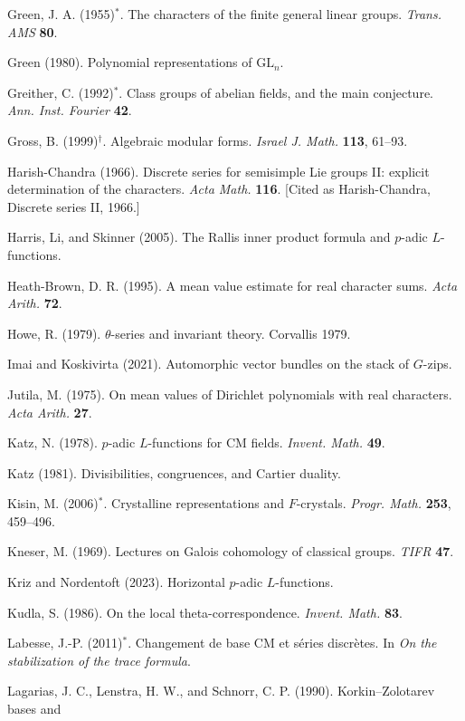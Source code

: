 \begin{list}{}{\setlength{\leftmargin}{1.5em}\setlength{\itemindent}{-1.5em}\setlength{\itemsep}{2pt}\setlength{\parsep}{0pt}}
\item Green, J. A. (1955)$^*$. The characters of the finite general linear groups. \emph{Trans. AMS}
  \textbf{80}.
\item Green (1980). Polynomial representations of $\mathrm{GL}_n$.
\item Greither, C. (1992)$^*$. Class groups of abelian fields, and the main conjecture. \emph{Ann.
  Inst. Fourier} \textbf{42}.
\item Gross, B. (1999)$^\dagger$. Algebraic modular forms. \emph{Israel J. Math.} \textbf{113},
  61--93.
\item Harish-Chandra (1966). Discrete series for semisimple Lie groups II: explicit determination of
  the characters. \emph{Acta Math.} \textbf{116}. [Cited as Harish-Chandra, Discrete series II, 1966.]
\item Harris, Li, and Skinner (2005). The Rallis inner product formula and $p$-adic $L$-functions.
\item Heath-Brown, D. R. (1995). A mean value estimate for real character sums. \emph{Acta Arith.}
  \textbf{72}.
\item Howe, R. (1979). $\theta$-series and invariant theory. Corvallis 1979.
\item Imai and Koskivirta (2021). Automorphic vector bundles on the stack of $G$-zips.
\item Jutila, M. (1975). On mean values of Dirichlet polynomials with real characters. \emph{Acta
  Arith.} \textbf{27}.
\item Katz, N. (1978). $p$-adic $L$-functions for CM fields. \emph{Invent. Math.} \textbf{49}.
\item Katz (1981). Divisibilities, congruences, and Cartier duality.
\item Kisin, M. (2006)$^*$. Crystalline representations and $F$-crystals. \emph{Progr. Math.}
  \textbf{253}, 459--496.
\item Kneser, M. (1969). Lectures on Galois cohomology of classical groups. \emph{TIFR}
  \textbf{47}.
\item Kriz and Nordentoft (2023). Horizontal $p$-adic $L$-functions.
\item Kudla, S. (1986). On the local theta-correspondence. \emph{Invent. Math.} \textbf{83}.
\item Labesse, J.-P. (2011)$^*$. Changement de base CM et s\'eries discr\`etes. In \emph{On the
  stabilization of the trace formula}.
\item Lagarias, J. C., Lenstra, H. W., and Schnorr, C. P. (1990). Korkin--Zolotarev bases and

\end{list}
